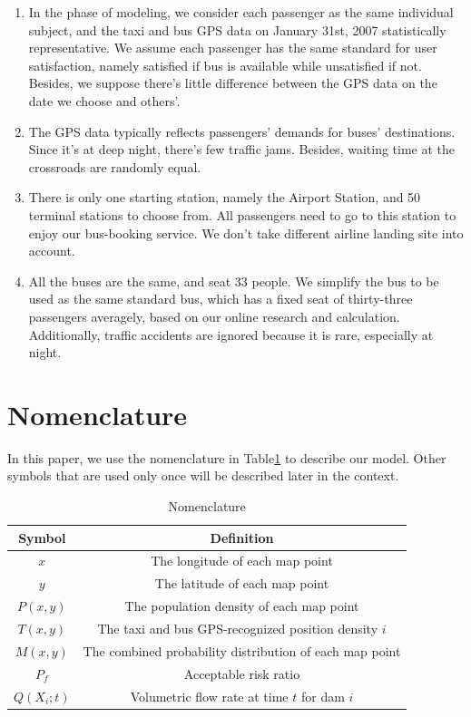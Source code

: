 \documentclass{mcmthesis}
\begin{document}
\begin{enumerate}
	\item In the phase of modeling, we consider each passenger as the same individual subject, and the taxi and bus GPS data on January 31st, 2007 statistically representative. We assume each passenger has the same standard for user satisfaction, namely satisfied if bus is available while unsatisfied if not. Besides, we suppose there's little difference between the GPS data on the date we choose and others'.
	\item The GPS data typically reflects passengers' demands for buses' destinations. Since it's at deep night, there's few traffic jams. Besides, waiting time at the crossroads are randomly equal. 
	\item There is only one starting station, namely the Airport Station, and 50 terminal stations to choose from. All passengers need to go to this station to enjoy our bus-booking service. We don't take different airline landing site into account. 
	\item All the buses are the same, and seat 33 people. We simplify the bus to be used as the same standard bus, which has a fixed seat of thirty-three passengers averagely, based on our online research and calculation. Additionally, traffic accidents are ignored because it is rare, especially at night.
\end{enumerate}

\section{Nomenclature}
In this paper, we use the nomenclature in Table\ref{tab:Nomen} to describe our model. Other symbols that are used only once will be described later in the context.
\begin{table}
    \centering
    \caption{Nomenclature}
    \label{tab:Nomen}
    \begin{tabular}{c c}
\hline
    	Symbol & Definition\\
\hline
	$x$ & The longitude of each map point\\
	$y$ & The latitude of each map point\\
	$P(x,y)$ & The population density of each map point\\
	$T(x,y)$ & The taxi and bus GPS-recognized position density $i$\\
	$M(x,y)$ & The combined probability distribution of each map point\\
	$P_f$ & Acceptable risk ratio\\
	$Q(X_i;t)$ & Volumetric flow rate at time $t$ for dam $i$\\
\hline
    \end{tabular}
\end{table}
\end{document}
